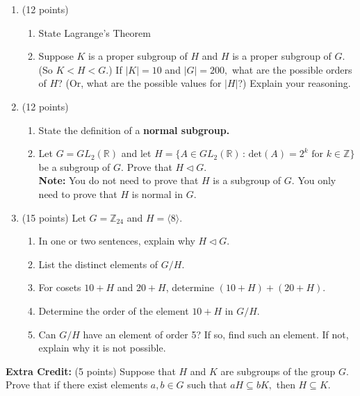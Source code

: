 \documentclass[12pt]{article}
\renewcommand{\emph}[1]{\textsf{\textbf{#1}}}
\newcommand{\bbZ}{\mathbb{Z}}
\newcommand{\bbR}{\mathbb{R}}
\begin{document}
\begin{enumerate}
\item (12 points)
	\begin{enumerate}
	\item State Lagrange's Theorem
	\vfill
	\item Suppose $K$ is a proper subgroup of $H$ and $H$ is a proper subgroup of $G.$ (So $K<H<G.$) If $|K|=10$ and $|G|=200,$ what are the possible orders of $H$? (Or, what are the possible values for $|H|$?) Explain your reasoning.
	\vfill
	\end{enumerate}
\newpage
\item (12 points)
	\begin{enumerate}
	\item State the definition of a \emph{normal subgroup.}
	\vspace{1in}
	\item Let $G=GL_2(\bbR)$ and let $H=\{ A \in GL_2(\bbR) \,  : \, \text{det}(A)=2^k \text{ for } k \in \bbZ\}$ be a subgroup of $G.$ Prove that $H \lhd G.$ \\
	\emph{Note:} You do not need to prove that $H$ is a subgroup of $G.$ You only need to prove that $H$ is normal in $G.$
	\vfill
	\end{enumerate}

\newpage

\item (15 points) Let $G=\bbZ_{24}$ and $H=\langle 8 \rangle.$
	\begin{enumerate}
	\item In one or two sentences, explain why $H \lhd G.$
	\vfill
	\item List the distinct elements of $G/H.$
	\vfill
	\item For cosets $10+H$ and $20 +H$, determine $(10+H)+(20+H).$
	\vfill
	\item Determine the order of the element $10 + H$ in $G/H.$
	\vfill
	\item Can $G/H$ have an element of order 5? If so, find such an element. If not, explain why it is not possible.
	\vfill
	\end{enumerate}
\newpage
\end{enumerate}
\emph{Extra Credit:} (5 points) Suppose that $H$ and $K$ are subgroups of the group $G.$ Prove that if there exist elements $a,b \in G$ such that $aH \subseteq bK,$ then $H \subseteq K.$
\end{document}
